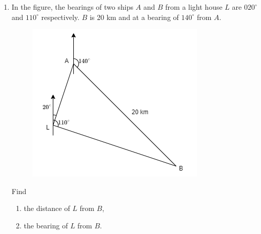 \documentclass[11pt]{article}
\begin{document}
\begin{enumerate}
        \hrulefill
        
        \hrulefill
        
        \hrulefill
        
        \hrulefill
        
        \hrulefill
        
        \hrulefill

    \pagebreak
    \item In the figure, the bearings of two ships $A$ and $B$ from a light house $L$ are $020^\circ$ and $110^\circ$ respectively. $B$ is 20 km and at a bearing of $140^\circ$ from $A$.\begin{figure}[H]
        \centering
        \includegraphics[scale=0.6]{f4finalq37.png}
    \end{figure} Find \begin{enumerate}
        \item the distance of $L$ from $B$,
        \item the bearing of $L$ from $B$.
    \end{enumerate}

    \hrulefill

        \hrulefill
            
        \hrulefill
        
        \hrulefill
        
        \hrulefill
        
        \hrulefill
        
        \hrulefill
        
        \hrulefill
        
        \hrulefill
        
        \hrulefill
        
        \hrulefill
        

\end{enumerate}
\end{document}
